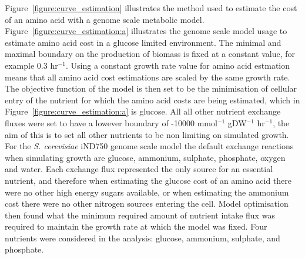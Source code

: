 Figure~\vref{figure:curve_estimation} illustrates the method used to estimate the cost of an amino acid with a genome scale metabolic model. Figure~\ref{figure:curve_estimation:a} illustrates the genome scale model usage to estimate amino acid cost in a glucose limited environment. The minimal and maximal boundary on the production of biomass is fixed at a constant value, for example 0.3 hr$^{-1}$. Using a constant growth rate value for amino acid estmation means that all amino acid cost estimations are scaled by the same growth rate. The objective function of the model is then set to be the minimisation of cellular entry of the nutrient for which the amino acid costs are being estimated, which in Figure~\ref{figure:curve_estimation:a} is glucose. All all other nutrient exchange fluxes were set to have a lowever boundary of -10000 mmol$^{-1}$ gDW$^{-1}$ hr$^{-1}$, the aim of this is to set all other nutrients to be non limiting on simulated growth. For the \emph{S. cerevisiae} iND750 \cite{duarte2004a} genome scale model the default exchange reactions when simulating growth are glucose, ammonium, sulphate, phosphate, oxygen and water. Each exchange flux represented the only source for an essential nutrient, and therefore when estimating the glucose cost of an amino acid there were no other high energy sugars available, or when estimating the ammonium cost there were no other nitrogen sources entering the cell. Model optimisation then found what the minimum required amount of nutrient intake flux was required to maintain the growth rate at which the model was fixed. Four nutrients were considered in the analysis: glucose, ammonium, sulphate, and phosphate. 


